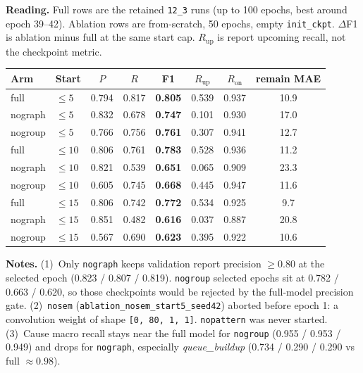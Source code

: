 \documentclass[10pt,a4paper]{article}
\begin{document}
\textbf{Reading.}
Full rows are the retained \texttt{12\_3} runs (up to 100 epochs, best around epoch 39--42).
Ablation rows are from-scratch, 50 epochs, empty \texttt{init\_ckpt}.
$\Delta$F1 is ablation minus full at the same start cap.
$R_{\mathrm{up}}$ is report upcoming recall, not the checkpoint metric.

\begin{center}
\begin{tabular}{ll S[table-format=1.3] S[table-format=1.3] S[table-format=1.3] S[table-format=1.3] S[table-format=1.3] S[table-format=2.1]}
\toprule
{Arm} & {Start} & {$P$} & {$R$} & {F1} & {$R_{\mathrm{up}}$} & {$R_{\mathrm{on}}$} & {remain MAE} \\
\midrule
full    & $\le 5$  & 0.794 & 0.817 & \bfseries 0.805 & 0.539 & 0.937 & 10.9 \\
nograph & $\le 5$  & 0.832 & 0.678 & \bfseries 0.747 & 0.101 & 0.930 & 17.0 \\
nogroup & $\le 5$  & 0.766 & 0.756 & \bfseries 0.761 & 0.307 & 0.941 & 12.7 \\
\midrule
full    & $\le 10$ & 0.806 & 0.761 & \bfseries 0.783 & 0.528 & 0.936 & 11.2 \\
nograph & $\le 10$ & 0.821 & 0.539 & \bfseries 0.651 & 0.065 & 0.909 & 23.3 \\
nogroup & $\le 10$ & 0.605 & 0.745 & \bfseries 0.668 & 0.445 & 0.947 & 11.6 \\
\midrule
full    & $\le 15$ & 0.806 & 0.742 & \bfseries 0.772 & 0.534 & 0.925 & 9.7 \\
nograph & $\le 15$ & 0.851 & 0.482 & \bfseries 0.616 & 0.037 & 0.887 & 20.8 \\
nogroup & $\le 15$ & 0.567 & 0.690 & \bfseries 0.623 & 0.395 & 0.922 & 10.6 \\
\bottomrule
\end{tabular}
\end{center}

\small
\textbf{Notes.}
(1)~Only \texttt{nograph} keeps validation report precision $\ge 0.80$ at the selected epoch (0.823 / 0.807 / 0.819).
\texttt{nogroup} selected epochs sit at 0.782 / 0.663 / 0.620, so those checkpoints would be rejected by the full-model precision gate.
(2)~\texttt{nosem} (\texttt{ablation\_nosem\_start5\_seed42}) aborted before epoch 1: a convolution weight of shape \texttt{[0, 80, 1, 1]}. \texttt{nopattern} was never started.
(3)~Cause macro recall stays near the full model for \texttt{nogroup} (0.955 / 0.953 / 0.949) and drops for \texttt{nograph}, especially \textit{queue\_buildup} (0.734 / 0.290 / 0.290 vs full ${\approx}0.98$).
\end{document}
